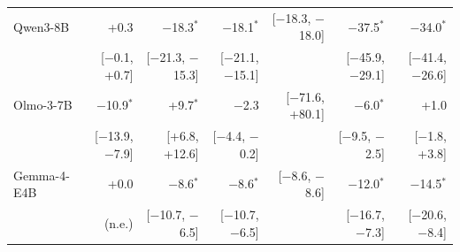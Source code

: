 \begin{tabular}{lrrrrrr}
Qwen3-8B & +0.3 & $-$18.3$^{*}$ & $-$18.1$^{*}$ & [$-$18.3, $-$18.0] & $-$37.5$^{*}$ & $-$34.0$^{*}$ \\
 & [$-$0.1, +0.7] & [$-$21.3, $-$15.3] & [$-$21.1, $-$15.1] &  & [$-$45.9, $-$29.1] & [$-$41.4, $-$26.6] \\[2pt]
Olmo-3-7B & $-$10.9$^{*}$ & +9.7$^{*}$ & $-$2.3 & [$-$71.6, +80.1] & $-$6.0$^{*}$ & +1.0 \\
 & [$-$13.9, $-$7.9] & [+6.8, +12.6] & [$-$4.4, $-$0.2] &  & [$-$9.5, $-$2.5] & [$-$1.8, +3.8] \\[2pt]
Gemma-4-E4B & +0.0 & $-$8.6$^{*}$ & $-$8.6$^{*}$ & [$-$8.6, $-$8.6] & $-$12.0$^{*}$ & $-$14.5$^{*}$ \\
 & (n.e.) & [$-$10.7, $-$6.5] & [$-$10.7, $-$6.5] &  & [$-$16.7, $-$7.3] & [$-$20.6, $-$8.4] \\
\bottomrule
\end{tabular}
